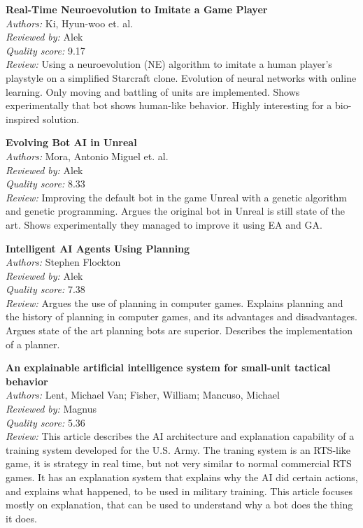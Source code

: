 {\textbf{Real-Time Neuroevolution to Imitate a Game Player\cite{ki2006real}}\\
\textit{Authors:} Ki, Hyun-woo et. al.\\
\textit{Reviewed by:} Alek\\
\textit{Quality score:} 9.17\\
\textit{Review:} Using a neuroevolution (NE) algorithm to imitate a human player's playstyle on a simplified Starcraft clone. Evolution of neural networks with online learning. Only moving and battling of units are implemented. Shows experimentally that bot shows human-like behavior. Highly interesting for a bio-inspired solution.

\textbf{Evolving Bot AI in Unreal\cite{mora2010evolving}} \\
\textit{Authors:} Mora, Antonio Miguel et. al.\\
\textit{Reviewed by:} Alek\\
\textit{Quality score:} 8.33\\
\textit{Review:} Improving the default bot in the game Unreal with a genetic algorithm and genetic programming. Argues the original bot in Unreal is still state of the art. Shows experimentally they managed to improve it using EA and GA.

\textbf{Intelligent AI Agents Using Planning\cite{flockton2008intelligent}} \\
\textit{Authors:} Stephen Flockton\\
\textit{Reviewed by:} Alek\\
\textit{Quality score:} 7.38\\
\textit{Review:} Argues the use of planning in computer games. Explains planning and the history of planning in computer games, and its advantages and disadvantages. Argues state of the art planning bots are superior. Describes the implementation of a planner.

\textbf{An explainable artificial intelligence system for small-unit tactical behavior\cite{Lent2004}}\\
\textit{Authors:} Lent, Michael Van; Fisher, William; Mancuso, Michael\\
\textit{Reviewed by:} Magnus\\
\textit{Quality score:} 5.36\\
\textit{Review:} This article describes the AI architecture and explanation capability of a training system developed for the U.S. Army. The traning system is an RTS-like game, it is strategy in real time, but not very similar to normal commercial RTS games. It has an explanation system that explains why the AI did certain actions, and explains what happened, to be used in military training. This article focuses mostly on explanation, that can be used to understand why a bot does the thing it does.

}
